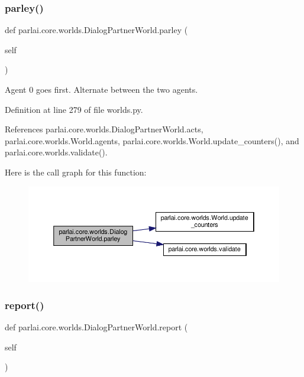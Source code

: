 \subsubsection{\texorpdfstring{parley()}{parley()}}
{\footnotesize\ttfamily def parlai.\+core.\+worlds.\+Dialog\+Partner\+World.\+parley (\begin{DoxyParamCaption}\item[{}]{self }\end{DoxyParamCaption})}

\begin{DoxyVerb}Agent 0 goes first. Alternate between the two agents.\end{DoxyVerb}
 

Definition at line 279 of file worlds.\+py.



References parlai.\+core.\+worlds.\+Dialog\+Partner\+World.\+acts, parlai.\+core.\+worlds.\+World.\+agents, parlai.\+core.\+worlds.\+World.\+update\+\_\+counters(), and parlai.\+core.\+worlds.\+validate().

Here is the call graph for this function\+:
\nopagebreak
\begin{figure}[H]
\begin{center}
\leavevmode
\includegraphics[width=350pt]{classparlai_1_1core_1_1worlds_1_1DialogPartnerWorld_a3ae10cae524d87d709e55bc7b2fd8265_cgraph}
\end{center}
\end{figure}
\mbox{\label{classparlai_1_1core_1_1worlds_1_1DialogPartnerWorld_a7cf7d09efbe302c30e885641a0189ae8}} 
\subsubsection{\texorpdfstring{report()}{report()}}
{\footnotesize\ttfamily def parlai.\+core.\+worlds.\+Dialog\+Partner\+World.\+report (\begin{DoxyParamCaption}\item[{}]{self }\end{DoxyParamCaption})}


